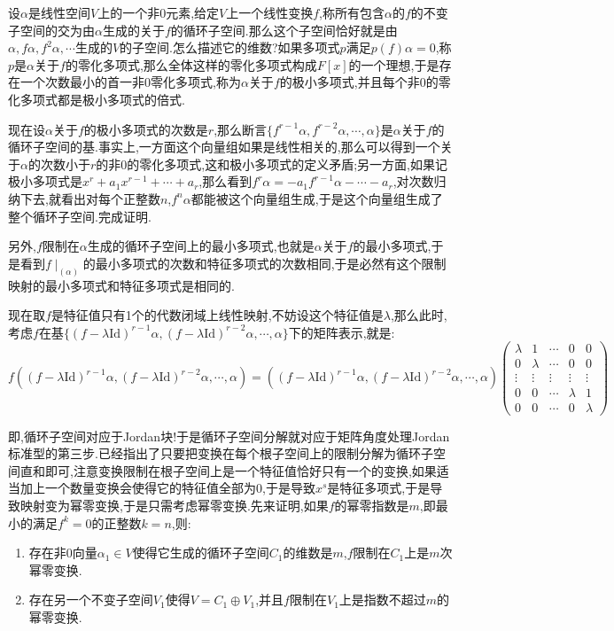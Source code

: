 设$\alpha$是线性空间$V$上的一个非0元素,给定$V$上一个线性变换$f$,称所有包含$\alpha$的$f$的不变子空间的交为由$\alpha$生成的关于$f$的循环子空间.那么这个子空间恰好就是由$\alpha,f\alpha,f^2\alpha,\cdots$生成的$V$的子空间.怎么描述它的维数?如果多项式$p$满足$p(f)\alpha=0$,称$p$是$\alpha$关于$f$的零化多项式,那么全体这样的零化多项式构成$F[x]$的一个理想,于是存在一个次数最小的首一非0零化多项式,称为$\alpha$关于$f$的极小多项式,并且每个非0的零化多项式都是极小多项式的倍式.

现在设$\alpha$关于$f$的极小多项式的次数是$r$,那么断言$\{f^{r-1}\alpha,f^{r-2}\alpha,\cdots,\alpha\}$是$\alpha$关于$f$的循环子空间的基.事实上,一方面这个向量组如果是线性相关的,那么可以得到一个关于$\alpha$的次数小于$r$的非0的零化多项式,这和极小多项式的定义矛盾;另一方面,如果记极小多项式是$x^r+a_1x^{r-1}+\cdots+a_r$,那么看到$f^r\alpha=-a_1f^{r-1}\alpha-\cdots-a_r$,对次数归纳下去,就看出对每个正整数$n$,$f^n\alpha$都能被这个向量组生成,于是这个向量组生成了整个循环子空间.完成证明.

另外,$f$限制在$\alpha$生成的循环子空间上的最小多项式,也就是$\alpha$关于$f$的最小多项式,于是看到$f\mid_{(\alpha)}$的最小多项式的次数和特征多项式的次数相同,于是必然有这个限制映射的最小多项式和特征多项式是相同的.

现在取$f$是特征值只有1个的代数闭域上线性映射,不妨设这个特征值是$\lambda$,那么此时,考虑$f$在基$\{(f-\lambda\mathrm{Id})^{r-1}\alpha,(f-\lambda\mathrm{Id})^{r-2}\alpha,\cdots,\alpha\}$下的矩阵表示,就是:
$$f((f-\lambda\mathrm{Id})^ {r-1}\alpha,(f-\lambda\mathrm{Id})^{r-2}\alpha,\cdots,\alpha)=((f-\lambda\mathrm{Id})^ {r-1}\alpha,(f-\lambda\mathrm{Id})^{r-2}\alpha,\cdots,\alpha)\left(\begin{array}{ccccc}
\lambda&1&\cdots&0&0\\
0&\lambda&\cdots&0&0\\
\vdots&\vdots&\vdots&\vdots&\vdots\\
0&0&\cdots&\lambda&1\\
0&0&\cdots&0&\lambda\end{array}\right)$$

即,循环子空间对应于Jordan块!于是循环子空间分解就对应于矩阵角度处理Jordan标准型的第三步.已经指出了只要把变换在每个根子空间上的限制分解为循环子空间直和即可,注意变换限制在根子空间上是一个特征值恰好只有一个的变换,如果适当加上一个数量变换会使得它的特征值全部为0,于是导致$x^s$是特征多项式,于是导致映射变为幂零变换,于是只需考虑幂零变换.先来证明,如果$f$的幂零指数是$m$,即最小的满足$f^k=0$的正整数$k=n$,则:
\begin{enumerate}
	\item 存在非0向量$\alpha_1\in V$使得它生成的循环子空间$C_1$的维数是$m$,$f$限制在$C_1$上是$m$次幂零变换.
	\item 存在另一个不变子空间$V_1$使得$V=C_1\oplus V_1$,并且$f$限制在$V_1$上是指数不超过$m$的幂零变换.
\end{enumerate}

